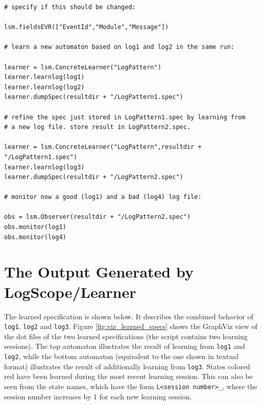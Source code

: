 \documentclass{report}
\newcommand{\logscopeLearner}{{\sc LogScope/Learner}}
\begin{document}
\begin{verbatim}
# specify if this should be changed:

lsm.fieldsEVR(["EventId","Module","Message"])
              
# learn a new automaton based on log1 and log2 in the same run:

learner = lsm.ConcreteLearner("LogPattern")
learner.learnlog(log1)
learner.learnlog(log2)
learner.dumpSpec(resultdir + "/LogPattern1.spec")

# refine the spec just stored in LogPattern1.spec by learning from 
# a new log file. store result in LogPattern2.spec.

learner = lsm.ConcreteLearner("LogPattern",resultdir + "/LogPattern1.spec")
learner.learnlog(log3)
learner.dumpSpec(resultdir + "/LogPattern2.spec")

# monitor now a good (log1) and a bad (log4) log file:
        
obs = lsm.Observer(resultdir + "/LogPattern2.spec")
obs.monitor(log1)
obs.monitor(log4)
\end{verbatim}

\section{The Output Generated by \logscopeLearner}

The learned specification is shown below. It describes the 
combined behavior of {\tt log1}, {\tt log2} and {\tt log3}. 
Figure \ref{fig:viz_learned_specs} shows the GraphViz view of the 
dot files of the two learned specifications (the script contains two learning sessions). The top automaton illustrates the result of learning from {\tt log1} and {\tt log2},
while the bottom automaton (equivalent to the one shown in textual format) 
illustrates the result of additionally learning from {\tt log3}. States colored red have been
learned during the most recent learning session. This can also be seen from the
state names, which have the form {\tt L<session number>\_<state number>}, where the
session number increases by 1 for each new learning session.

\newpage
\end{document}
